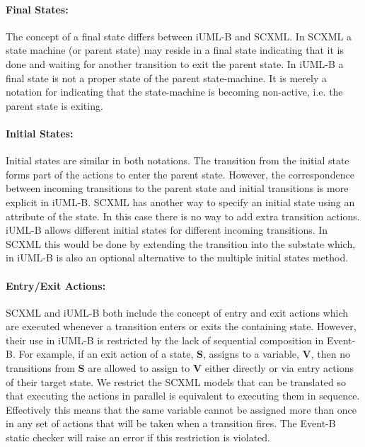\paragraph{Final States:}
The concept of a final state differs between iUML-B and SCXML. 
In SCXML a state machine (or parent state) may reside in a final state indicating that it is done and waiting for another transition to exit the parent state. In iUML-B a final state is not a proper state of the parent state-machine. 
It is merely a notation for indicating that the state-machine is becoming non-active, i.e. the parent state is exiting. 
\vspace{-0.10cm}

\paragraph{Initial States:}
Initial states are similar in both notations. 
The transition from the initial state forms part of the actions to enter the parent state. 
However, the correspondence between incoming transitions to the parent state and initial transitions is more explicit in iUML-B. 
SCXML has another way to specify an initial state using an attribute of the state.
 In this case there is no way to add extra transition actions.
iUML-B allows different initial states for different incoming transitions. 
In SCXML this would be done by extending the transition into the substate which, in iUML-B is also an optional alternative to the multiple initial states method.
\vspace{-0.10cm}

\paragraph{Entry/Exit Actions:}
SCXML and iUML-B both include the concept of entry and exit actions which are executed whenever a transition enters or exits the containing state. 
However, their use in iUML-B is restricted by the lack of sequential composition in Event-B. 
For example, if an exit action of a state, \textbf{S}, assigns to a variable, \textbf{V}, then no transitions from \textbf{S} are allowed to assign to \textbf{V} either directly or via entry actions of their target state.
We restrict the SCXML models that can be translated so that executing the actions in parallel is equivalent to executing them in sequence.
Effectively this means that the same variable cannot be assigned more than once in any set of actions that will be taken when a transition fires. 
The Event-B static checker will raise an error if this restriction is violated.
\vspace{-0.10cm}

